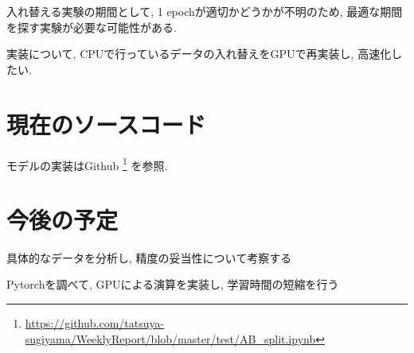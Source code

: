 \documentclass[twocolumn]{jarticle}     %
\begin{document}
入れ替える実験の期間として, 1 epochが適切かどうかが不明のため, 最適な期間を探す実験が必要な可能性がある.

実装について, CPUで行っているデータの入れ替えをGPUで再実装し, 高速化したい.

\section{現在のソースコード}
モデルの実装はGithub
\footnote[1]{\url{https://github.com/tatsuya-sugiyama/WeeklyReport/blob/master/test/AB_split.ipynb}}
を参照.


\section{今後の予定}

\begin{itemize}{ %
		\item{具体的なデータを分析し, 精度の妥当性について考察する}
		\item{Pytorchを調べて, GPUによる演算を実装し, 学習時間の短縮を行う}
}\end{itemize}


	
	
\end{document}
